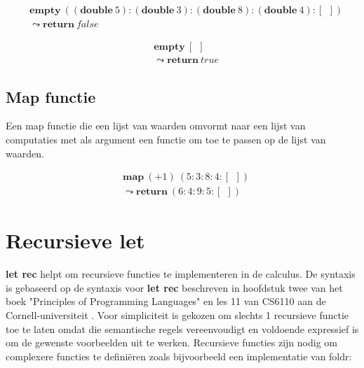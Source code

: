 \begin{equation}
    \begin{split}
        & \textbf{empty}\:((\textbf{double}\:5):(\textbf{double}\:3):(\textbf{double}\:8):(\textbf{double}\:4):[\:\:]) \\
        & \leadsto \textbf{return}\:false
    \end{split}
\end{equation}


\begin{equation}
    \begin{split}
        & \textbf{empty}\:[\:\:] \\
        & \leadsto \textbf{return}\:true
    \end{split}
\end{equation}

\subsection{Map functie}
Een map functie die een lijst van waarden omvormt naar een lijst van computaties met als argument een functie om toe te passen op de lijst van waarden.

\begin{equation}
    \begin{split}
        & \textbf{map}\:(+1)\:(5:3:8:4:[\:\:]) \\
        & \leadsto \textbf{return}\:(6:4:9:5:[\:\:])
    \end{split}
\end{equation}

\section{Recursieve let}
\textbf{let rec} helpt om recursieve functies te implementeren in de calculus. De syntaxis is gebaseerd op de syntaxis voor \textbf{let rec} beschreven in hoofdstuk twee van het boek "Principles of Programming Languages" \cite{Palmer2009} en les 11 van CS6110 aan de Cornell-universiteit \cite{Sampson2018}. Voor simpliciteit is gekozen om slechts 1 recursieve functie toe te laten omdat die semantische regels vereenvoudigt en voldoende expressief is om de gewenste voorbeelden uit te werken.  Recursieve functies zijn nodig om complexere functies te definiëren zoals bijvoorbeeld een implementatie van foldr:

